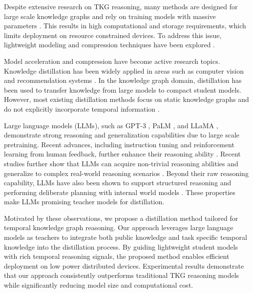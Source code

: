 \documentclass[11pt]{article}
\begin{document}
Despite extensive research on TKG reasoning, many methods are designed for large scale knowledge graphs and rely on training models with massive parameters \citep{garcia2020temporal}. This results in high computational and storage requirements, which limits deployment on resource constrained devices. To address this issue, lightweight modeling and compression techniques have been explored \citep{hinton2015distilling}.

Model acceleration and compression have become active research topics. Knowledge distillation has been widely applied in areas such as computer vision and recommendation systems \citep{hinton2015distilling}. In the knowledge graph domain, distillation has been used to transfer knowledge from large models to compact student models. However, most existing distillation methods focus on static knowledge graphs and do not explicitly incorporate temporal information \citep{zhang2020relational}.

Large language models (LLMs), such as GPT-3 \citep{brown2020language}, PaLM \citep{chowdhery2022palm}, and LLaMA \citep{touvron2023llama}, demonstrate strong reasoning and generalization capabilities due to large scale pretraining. 
Recent advances, including instruction tuning and reinforcement learning from human feedback, further enhance their reasoning ability \citep{ouyang2022training}. 
Recent studies further show that LLMs can acquire non-trivial reasoning abilities and generalize to complex real-world reasoning scenarios \citep{xiong2024large, yang2024can}.
Beyond their raw reasoning capability, LLMs have also been shown to support structured reasoning and performing deliberate planning with internal world models \citep{yang2024harnessing, xiong2025deliberate}. 
These properties make LLMs promising teacher models for distillation.

Motivated by these observations, we propose a distillation method tailored for temporal knowledge graph reasoning. Our approach leverages large language models as teachers to integrate both public knowledge and task specific temporal knowledge into the distillation process. By guiding lightweight student models with rich temporal reasoning signals, the proposed method enables efficient deployment on low power distributed devices. Experimental results demonstrate that our approach consistently outperforms traditional TKG reasoning models while significantly reducing model size and computational cost.
\end{document}
